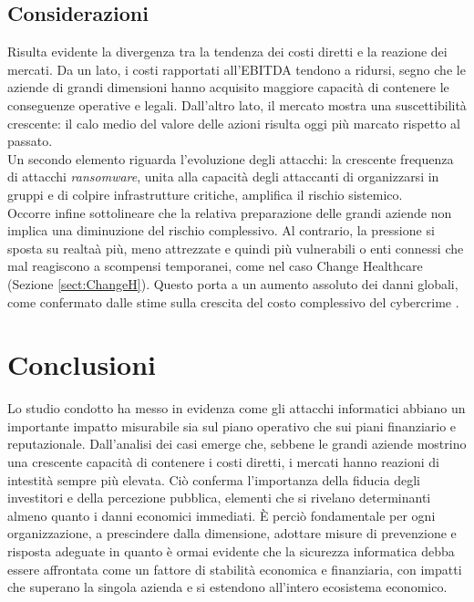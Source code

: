 \documentclass[12pt,a4paper,twoside]{report}
\begin{document}
\section{Considerazioni}

Risulta evidente la divergenza tra la tendenza dei costi diretti e la reazione dei mercati. 
Da un lato, i costi rapportati all'EBITDA tendono a ridursi, segno che le aziende di grandi dimensioni 
hanno acquisito maggiore capacit\`a di contenere le conseguenze operative e legali. Dall'altro lato, il mercato 
mostra una suscettibilit\`a crescente: il calo medio del valore delle azioni risulta oggi pi\`u marcato rispetto al passato.\\
Un secondo elemento riguarda l'evoluzione degli attacchi: la crescente frequenza di attacchi \textit{ransomware}, unita alla  
capacit\`a degli attaccanti di organizzarsi in gruppi e di colpire infrastrutture critiche, amplifica il rischio sistemico.\\ 
Occorre infine sottolineare che la relativa preparazione delle grandi aziende non implica una diminuzione del rischio 
complessivo. Al contrario, la pressione si sposta su realta\`a pi\`u, meno attrezzate e quindi pi\`u vulnerabili o enti connessi 
che mal reagiscono a scompensi temporanei, come nel caso Change Healthcare (Sezione \ref{sect:ChangeH}). 
Questo porta a un aumento assoluto dei danni globali, come confermato dalle stime sulla crescita del costo complessivo 
del cybercrime  \cite{cybercrime_magazine}.



\chapter{Conclusioni}
Lo studio condotto ha messo in evidenza come gli attacchi informatici abbiano un importante impatto 
misurabile sia sul piano operativo che sui piani finanziario e reputazionale.
Dall'analisi dei casi emerge che, sebbene le grandi aziende mostrino una crescente capacit\`a
di contenere i costi diretti, i mercati hanno reazioni di intestit\`a sempre pi\`u elevata.
Ciò conferma l'importanza della fiducia degli investitori e della percezione pubblica, 
elementi che si rivelano determinanti almeno quanto i danni economici immediati.
\`E perci\`o fondamentale per ogni organizzazione, a prescindere dalla dimensione, adottare misure di 
prevenzione e risposta adeguate in quanto \`e ormai evidente che la sicurezza informatica debba essere affrontata
come un fattore di stabilit\`a economica e finanziaria, con impatti che superano 
la singola azienda e si estendono all'intero ecosistema economico.\\
\end{document}
